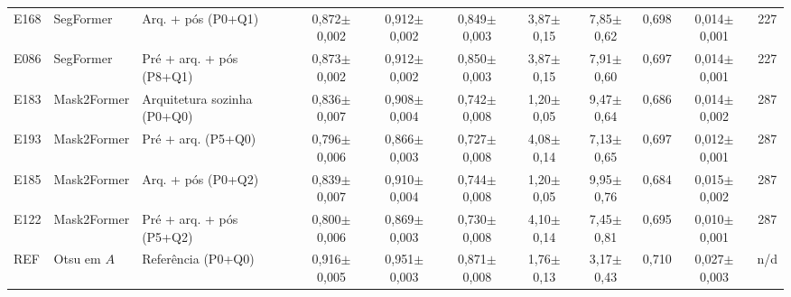 \begin{table}[t]
\begin{tabularx}{\textwidth}{L{0.7cm} L{1.6cm} Y c c c c c c c c}
E168 & SegFormer & Arq. + pós (P0+Q1) & 0,872{\scriptsize$\pm$0,002} & 0,912{\scriptsize$\pm$0,002} & 0,849{\scriptsize$\pm$0,003} & 3,87{\scriptsize$\pm$0,15} & 7,85{\scriptsize$\pm$0,62} & 0,698 & 0,014{\scriptsize$\pm$0,001} & 227 \\
E086 & SegFormer & Pré + arq. + pós (P8+Q1) & 0,873{\scriptsize$\pm$0,002} & 0,912{\scriptsize$\pm$0,002} & 0,850{\scriptsize$\pm$0,003} & 3,87{\scriptsize$\pm$0,15} & 7,91{\scriptsize$\pm$0,60} & 0,697 & 0,014{\scriptsize$\pm$0,001} & 227 \\
\addlinespace
E183 & Mask2Former & Arquitetura sozinha (P0+Q0) & 0,836{\scriptsize$\pm$0,007} & 0,908{\scriptsize$\pm$0,004} & 0,742{\scriptsize$\pm$0,008} & 1,20{\scriptsize$\pm$0,05} & 9,47{\scriptsize$\pm$0,64} & 0,686 & 0,014{\scriptsize$\pm$0,002} & 287 \\
E193 & Mask2Former & Pré + arq. (P5+Q0) & 0,796{\scriptsize$\pm$0,006} & 0,866{\scriptsize$\pm$0,003} & 0,727{\scriptsize$\pm$0,008} & 4,08{\scriptsize$\pm$0,14} & 7,13{\scriptsize$\pm$0,65} & 0,697 & 0,012{\scriptsize$\pm$0,001} & 287 \\
E185 & Mask2Former & Arq. + pós (P0+Q2) & 0,839{\scriptsize$\pm$0,007} & 0,910{\scriptsize$\pm$0,004} & 0,744{\scriptsize$\pm$0,008} & 1,20{\scriptsize$\pm$0,05} & 9,95{\scriptsize$\pm$0,76} & 0,684 & 0,015{\scriptsize$\pm$0,002} & 287 \\
E122 & Mask2Former & Pré + arq. + pós (P5+Q2) & 0,800{\scriptsize$\pm$0,006} & 0,869{\scriptsize$\pm$0,003} & 0,730{\scriptsize$\pm$0,008} & 4,10{\scriptsize$\pm$0,14} & 7,45{\scriptsize$\pm$0,81} & 0,695 & 0,010{\scriptsize$\pm$0,001} & 287 \\
\addlinespace
REF & Otsu em $A$ & Referência (P0+Q0) & 0,916{\scriptsize$\pm$0,005} & 0,951{\scriptsize$\pm$0,003} & 0,871{\scriptsize$\pm$0,008} & 1,76{\scriptsize$\pm$0,13} & 3,17{\scriptsize$\pm$0,43} & 0,710 & 0,027{\scriptsize$\pm$0,003} & n/d \\
\bottomrule
\end{tabularx}
\end{table}
